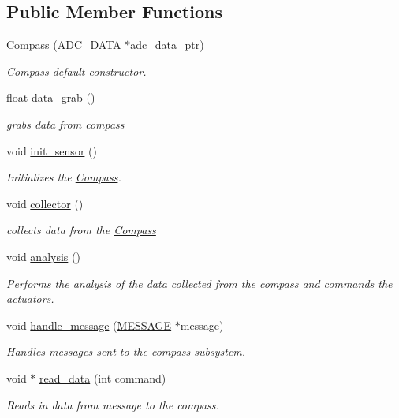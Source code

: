 \subsection*{Public Member Functions}
\begin{DoxyCompactItemize}
\item 
\hyperlink{classCompass_ab4210309aac39913ac3b20a0fef51df0}{Compass} (\hyperlink{struct__ADC__DATA}{A\-D\-C\-\_\-\-D\-A\-T\-A} $\ast$adc\-\_\-data\-\_\-ptr)
\begin{DoxyCompactList}\small\item\em \hyperlink{classCompass}{Compass} default constructor. \end{DoxyCompactList}\item 
float \hyperlink{classCompass_aa4132c05a4e20e95633c72776385bc42}{data\-\_\-grab} ()
\begin{DoxyCompactList}\small\item\em grabs data from compass \end{DoxyCompactList}\item 
void \hyperlink{classCompass_a5cc2b71700af542b5aafadea4820a476}{init\-\_\-sensor} ()
\begin{DoxyCompactList}\small\item\em Initializes the \hyperlink{classCompass}{Compass}. \end{DoxyCompactList}\item 
void \hyperlink{classCompass_ae8d7f3417a27b1d18487b96ca07dd32b}{collector} ()
\begin{DoxyCompactList}\small\item\em collects data from the \hyperlink{classCompass}{Compass} \end{DoxyCompactList}\item 
void \hyperlink{classCompass_a4dd6402d0ece9203c6b92670265b4c8d}{analysis} ()
\begin{DoxyCompactList}\small\item\em Performs the analysis of the data collected from the compass and commands the actuators. \end{DoxyCompactList}\item 
void \hyperlink{classCompass_a1fb0f64b335e8f1d4f27dc2067312b4a}{handle\-\_\-message} (\hyperlink{SUBSYS__COMMANDS_8h_ad814416fc1a8c675bea2687d96088a8f}{M\-E\-S\-S\-A\-G\-E} $\ast$message)
\begin{DoxyCompactList}\small\item\em Handles messages sent to the compass subsystem. \end{DoxyCompactList}\item 
void $\ast$ \hyperlink{classCompass_ab55d084e2d643df0a1970f5868d0c5a8}{read\-\_\-data} (int command)
\begin{DoxyCompactList}\small\item\em Reads in data from message to the compass. \end{DoxyCompactList}\end{DoxyCompactItemize}
